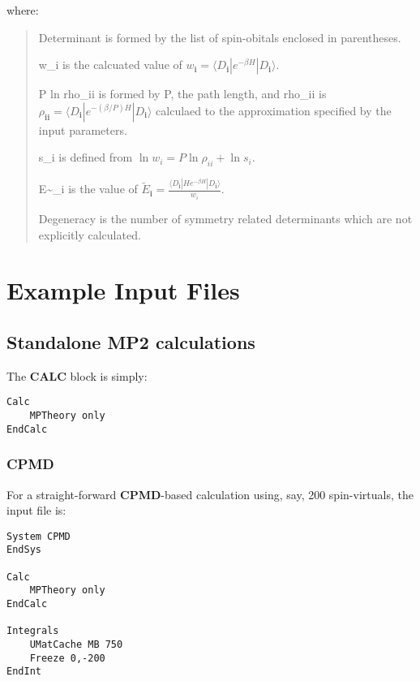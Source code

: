 \documentclass[openany,a4paper,10pt,english]{manual}
\newcommand{\bra}{\ensuremath{\langle}}
\newcommand{\ket}{\ensuremath{\rangle}}
\newcommand{\veci}{\ensuremath{\mathbf{i}}}
\begin{document}
where:
\begin{quote}

Determinant is formed by the list of spin-obitals enclosed in parentheses.

w\_i is the calcuated value of $w_{\veci}=\bra D_{\veci} | e^{-\beta H} | D_{\veci} \ket$.

P ln rho\_ii is formed by P, the path length, and rho\_ii is
$\rho_{\veci\veci}=\bra D_{\veci} | e^{-(\beta/P) H} | D_{\veci} \ket$
calculaed to the approximation specified by the input parameters.

s\_i is defined from $\operatorname{ln} w_i = P \operatorname{ln} \rho_{ii} + \operatorname{ln} s_i$.

E\textasciitilde{}\_i is the value of $\tilde{E}_{\veci}=\frac{\bra D_{\veci} | H e^{-\beta H} | D_{\veci} \ket}{w_i}$.

Degeneracy is the number of symmetry related determinants which are not explicitly calculated.
\end{quote}

\resetcurrentobjects
\hypertarget{--doc-example_inputs/index}{}

\hypertarget{example-inputs-index}{}\chapter{Example Input Files}

\resetcurrentobjects
\hypertarget{--doc-example_inputs/mptheoryonly}{}

\hypertarget{input-examples}{}\section{Standalone MP2 calculations}

The \textbf{CALC} block is simply:

\begin{Verbatim}[commandchars=@\[\]]
Calc
    MPTheory only
EndCalc
\end{Verbatim}


\subsection{CPMD}

For a straight-forward \textbf{CPMD}-based calculation using, say, 200 spin-virtuals, the input file is:

\begin{Verbatim}[commandchars=@\[\]]
System CPMD
EndSys

Calc
    MPTheory only
EndCalc

Integrals
    UMatCache MB 750
    Freeze 0,-200
EndInt
\end{Verbatim}
\end{document}
